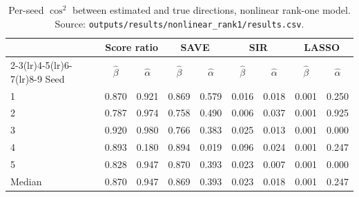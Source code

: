\begin{table}[h]
\centering
\caption{Per-seed $\cos^2$ between estimated and true directions, nonlinear rank-one model. Source: \texttt{outputs/results/nonlinear\_rank1/results.csv}.}
\label{tab:nonlinear_rank1_seeds}
\small
\begin{tabular}{lcccccccc}
\toprule
 & \multicolumn{2}{c}{Score ratio} & \multicolumn{2}{c}{SAVE} & \multicolumn{2}{c}{SIR} & \multicolumn{2}{c}{LASSO}\\
\cmidrule(lr){2-3}\cmidrule(lr){4-5}\cmidrule(lr){6-7}\cmidrule(lr){8-9}
Seed & $\hat\beta$ & $\hat\alpha$ & $\hat\beta$ & $\hat\alpha$ & $\hat\beta$ & $\hat\alpha$ & $\hat\beta$ & $\hat\alpha$\\
\midrule
1 & 0.870 & 0.921 & 0.869 & 0.579 & 0.016 & 0.018 & 0.001 & 0.250\\
2 & 0.787 & 0.974 & 0.758 & 0.490 & 0.006 & 0.037 & 0.001 & 0.925\\
3 & 0.920 & 0.980 & 0.766 & 0.383 & 0.025 & 0.013 & 0.001 & 0.000\\
4 & 0.893 & 0.180 & 0.894 & 0.019 & 0.096 & 0.024 & 0.001 & 0.247\\
5 & 0.828 & 0.947 & 0.870 & 0.393 & 0.023 & 0.007 & 0.001 & 0.000\\
\midrule
Median & 0.870 & 0.947 & 0.869 & 0.393 & 0.023 & 0.018 & 0.001 & 0.247\\
\bottomrule
\end{tabular}
\end{table}
